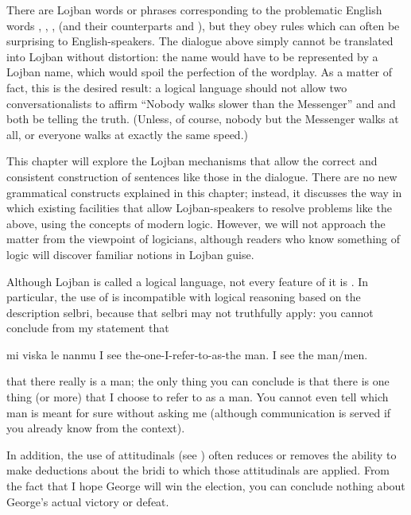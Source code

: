 There are Lojban words or phrases corresponding to the
    problematic English words , ,
    ,  (and their counterparts
     and ), but
    they obey rules which can often be surprising to
    English-speakers. The dialogue above simply cannot be
    translated into Lojban without distortion: the name 
    would have to be represented by a Lojban name, which would
    spoil the perfection of the wordplay. As a matter of fact, this
    is the desired result: a logical language should not allow two
    conversationalists to affirm ``Nobody walks slower than the
    Messenger'' and  and
    both be telling the truth. (Unless, of course, nobody but the
    Messenger walks at all, or everyone walks at exactly the same
    speed.)

This chapter will explore the Lojban mechanisms that allow
    the correct and consistent construction of sentences like those
    in the dialogue. There are no new grammatical constructs
    explained in this chapter; instead, it discusses the way in
    which existing facilities that allow Lojban-speakers to resolve
    problems like the above, using the concepts of modern logic.
    However, we will not approach the matter from the viewpoint of
    logicians, although readers who know something of logic will
    discover familiar notions in Lojban guise.

Although Lojban is called a logical language, not every
    feature of it is . In particular, the use of 
    is incompatible with logical reasoning based on the description
    selbri, because that selbri may not truthfully apply: you
    cannot conclude from my statement that
\begin{example}
mi viska le nanmu\n
I see the-one-I-refer-to-as-the man.\n
I see the man/men.
\end{example}

{\noindent}that there really is a man; the only thing you can conclude is
    that there is one thing (or more) that I choose to refer to as
    a man. You cannot even tell which man is meant for sure without
    asking me (although communication is served if you already know
    from the context). 

In addition, the use of attitudinals (see ) often reduces or removes the
    ability to make deductions about the bridi to which those
    attitudinals are applied. From the fact that I hope George will
    win the election, you can conclude nothing about George's
    actual victory or defeat.



